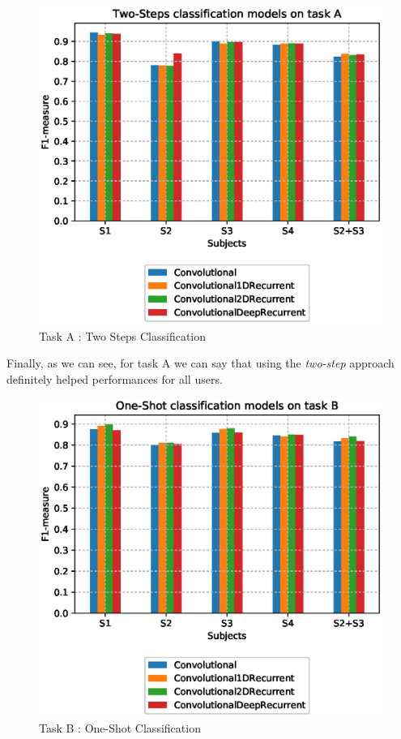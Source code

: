 \begin{figure}[ht]
	\centering
	\includegraphics[scale=.4]{figure/A_models_nonullclass}
	\caption{Task A : Two Steps Classification}
	\label{fig:Anonull}
\end{figure}

Finally, as we can see, for task A we can say that using the \textit{two-step} approach definitely helped performances for all users. 

\begin{figure}[ht]
	\centering
	\includegraphics[scale=.4]{figure/B_models_nullclass}
	\caption{Task B : One-Shot Classification}
	\label{fig:Bnull}
\end{figure}

